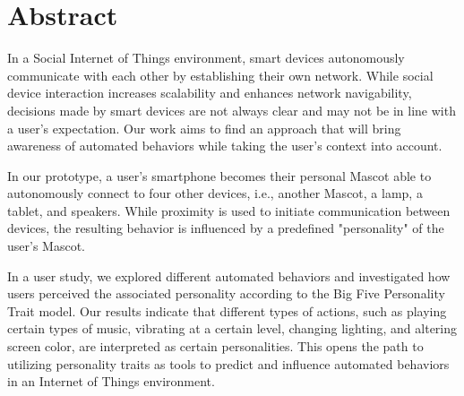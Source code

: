 ﻿\section*{Abstract}
In a Social Internet of Things environment, smart devices autonomously
communicate with each other by establishing their own network.
While social device interaction increases scalability and enhances network navigability,
decisions made by smart devices are not always clear and may not be in line with a user's expectation.
Our work aims to find an approach that will bring awareness of automated behaviors
while taking the user's context into account.

In our prototype, a user's smartphone becomes their personal Mascot able to autonomously
connect to four other devices, i.e., another Mascot, a lamp, a tablet, and speakers.
While proximity is used to initiate communication between devices, the resulting
behavior is influenced by a predefined "personality" of the user's Mascot.

In a user study, we explored different automated behaviors and investigated how users
perceived the associated personality according to the Big Five Personality Trait model.
Our results indicate that different types of actions, such as playing certain types of music,
vibrating at a certain level, changing lighting, and altering screen color, are interpreted as certain personalities.
This opens the path to utilizing personality traits as tools to predict and influence
automated behaviors in an Internet of Things environment.